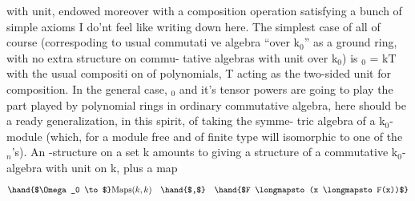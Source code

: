  with unit, endowed moreover with a composition operation 
satisfying a bunch of simple axioms I do'nt feel like writing down here.
The simplest case of all of course (correspoding to  usual commutati%
ve algebra ``over k$_0$'' as a ground ring, with no extra structure on commu-%
tative algebras with unit over k$_0$) is \hand{$\Omega$}$_0$ = k\hand{[}T\hand{]}\hand{,} with the usual compositi%
on of polynomials, T acting as the two-sided unit for composition. In
the general case, \hand{$\Omega$}$_0$ and it's tensor powers  are going to play the part
played by polynomial rings in ordinary commutative algebra,  here
should be a ready generalization, in this spirit, of taking the symme-%
tric algebra of a k$_0$-module (which, for a module free and of finite type\hand{,}
will  isomorphic to one of the \hand{$\Omega$}$_n$'s). An \hand{$\Omega$}-structure on a set  k
amounts to giving a structure of a commutative k$_0$-algebra with unit on k,
plus a map
\[ \hand{$\Omega_0 \to$} \mathrm{Maps}(k,k) \quad \hand{$,$} \quad \hand{$F \longmapsto (x \longmapsto F(x))$} \]


